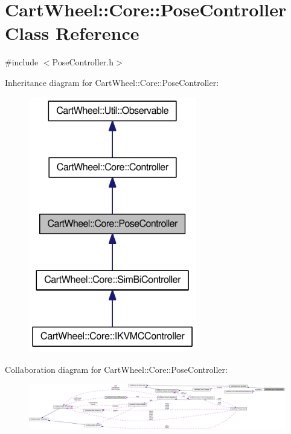 \hypertarget{classCartWheel_1_1Core_1_1PoseController}{
\section{CartWheel::Core::PoseController Class Reference}
\label{classCartWheel_1_1Core_1_1PoseController}
}


{\ttfamily \#include $<$PoseController.h$>$}



Inheritance diagram for CartWheel::Core::PoseController:\nopagebreak
\begin{figure}[H]
\begin{center}
\leavevmode
\includegraphics[width=208pt]{classCartWheel_1_1Core_1_1PoseController__inherit__graph}
\end{center}
\end{figure}


Collaboration diagram for CartWheel::Core::PoseController:\nopagebreak
\begin{figure}[H]
\begin{center}
\leavevmode
\includegraphics[width=400pt]{classCartWheel_1_1Core_1_1PoseController__coll__graph}
\end{center}
\end{figure}

